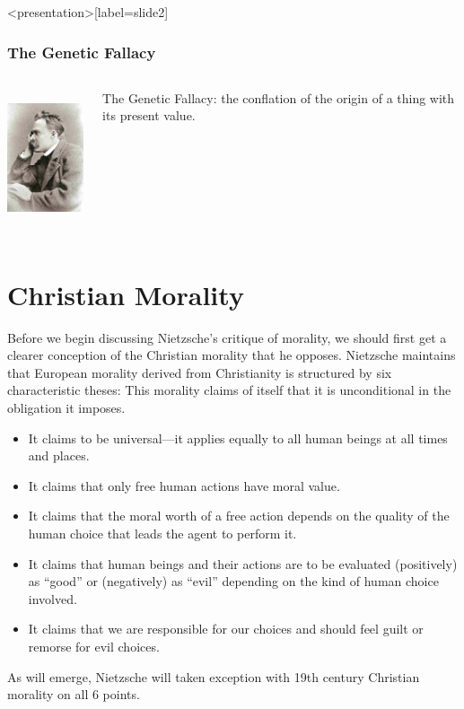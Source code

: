 \begin{frame}<presentation>[label=slide2]
    \frametitle{The Genetic Fallacy}
        \begin{columns}
            \begin{column}{3cm}
                \includegraphics[height=4cm]{../../../graphics/nietzsche.jpg}
            \end{column}
            \begin{column}{7cm}
                \alert{The Genetic Fallacy}: the conflation of the origin of a thing with its present value.
            \end{column}
        \end{columns}
\end{frame}



\section{Christian Morality}\label{sec:christian_morality} %

Before we begin discussing Nietzsche's critique of morality, we should first get a clearer conception of the Christian morality that he opposes. Nietzsche maintains that European morality derived from Christianity is structured by six characteristic theses:
This morality claims of itself that it is unconditional in the obligation it imposes.
\begin{itemize}
    \item It claims to be universal---it applies equally to all human beings at all times and places.
    \item It claims that only free human actions have moral value.
    \item It claims that the moral worth of a free action depends on the quality of the human choice that leads the agent to perform it.
    \item It claims that human beings and their actions are to be evaluated (positively) as  ``good'' or (negatively) as  ``evil'' depending on the kind of human choice involved.
    \item It claims that we are responsible for our choices and should feel guilt or remorse for evil choices.
\end{itemize}
As will emerge, Nietzsche will taken exception with 19th century Christian morality on all 6 points.

